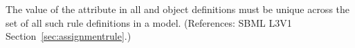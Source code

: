 The value of the  attribute in all \AssignmentRule and
\RateRule object definitions must be unique across the set of all such rule
definitions in a model.  (References: SBML L3V1 Section~\ref{sec:assignmentrule}.)
